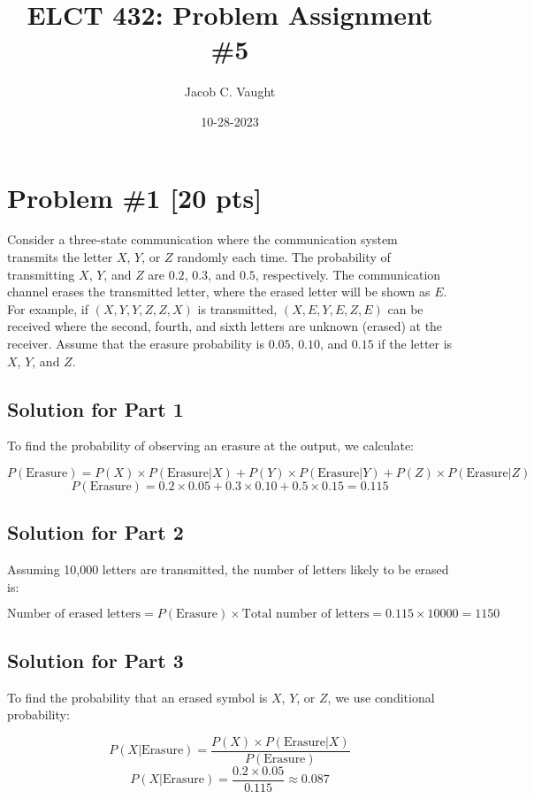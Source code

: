 \documentclass{article}
\begin{document}
\title{ELCT 432: Problem Assignment \#5}
\author{Jacob C. Vaught}
\date{10-28-2023}
\maketitle

\section*{Problem \#1 [20 pts]}
Consider a three-state communication where the communication system transmits the letter \(X\), \(Y\), or \(Z\) randomly each time. The probability of transmitting \(X\), \(Y\), and \(Z\) are \(0.2\), \(0.3\), and \(0.5\), respectively. The communication channel erases the transmitted letter, where the erased letter will be shown as \(E\). For example, if \( (X, Y, Y, Z, Z, X) \) is transmitted, \( (X, E, Y, E, Z, E) \) can be received where the second, fourth, and sixth letters are unknown (erased) at the receiver. Assume that the erasure probability is \(0.05\), \(0.10\), and \(0.15\) if the letter is \(X\), \(Y\), and \(Z\).

\subsection*{Solution for Part 1}
To find the probability of observing an erasure at the output, we calculate:

\[
P(\text{Erasure}) = P(X) \times P(\text{Erasure} | X) + P(Y) \times P(\text{Erasure} | Y) + P(Z) \times P(\text{Erasure} | Z)
\]
\[
P(\text{Erasure}) = 0.2 \times 0.05 + 0.3 \times 0.10 + 0.5 \times 0.15 = 0.115
\]

\subsection*{Solution for Part 2}
Assuming 10,000 letters are transmitted, the number of letters likely to be erased is:

\[
\text{Number of erased letters} = P(\text{Erasure}) \times \text{Total number of letters} = 0.115 \times 10000 = 1150
\]

\subsection*{Solution for Part 3}
To find the probability that an erased symbol is \(X\), \(Y\), or \(Z\), we use conditional probability:

\[
P(X | \text{Erasure}) = \frac{P(X) \times P(\text{Erasure} | X)}{P(\text{Erasure})}
\]
\[
P(X | \text{Erasure}) = \frac{0.2 \times 0.05}{0.115} \approx 0.087
\]
\end{document}
